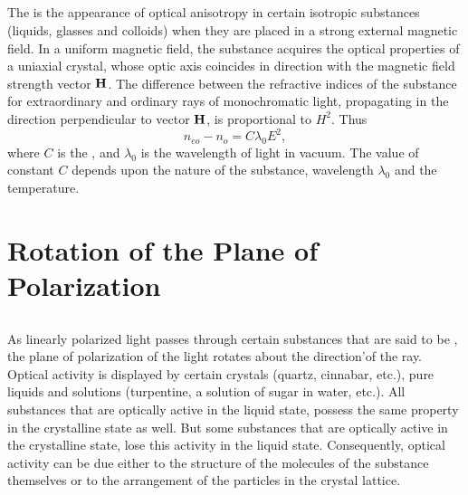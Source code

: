 \subsection{}\label{35.4.3} The  is the appearance of optical anisotropy in certain isotropic substances (liquids, glasses and colloids) when they are placed in a strong external magnetic field. In a uniform magnetic field, the substance acquires the optical properties of a uniaxial crystal, whose optic axis coincides in direction with the magnetic field strength vector $\vb{H}$. The
difference between the refractive indices of the substance for
extraordinary and ordinary rays of monochromatic light, propagating in the direction perpendicular to vector $\vb{H}$, is proportional to $H^{2}$. Thus
\begin{equation*}%
n_{eo} - n_{o} = C \lambda_{0} E^{2},
\end{equation*}
where $C$ is the , and $\lambda_{0}$ is the wavelength of light in vacuum. The value of constant $C$ depends upon the nature of the substance, wavelength $\lambda_{0}$ and the temperature.

\section{Rotation of the Plane of Polarization}
\label{sec-35.5}

\subsection{}\label{35.5.1} As linearly polarized light passes through certain substances that are said to be , the plane of polarization of the light  rotates about the direction'of the ray. Optical activity is displayed by certain crystals (quartz, cinnabar, etc.), pure liquids and solutions (turpentine, a solution of sugar in water, etc.). All substances that are optically active in the liquid state, possess the same property in the crystalline state as well. But some substances that are optically active in the crystalline state, lose this activity in the liquid state. Consequently, optical activity can be due either to the structure of the molecules of the substance themselves or to the arrangement of the particles in the crystal lattice.

